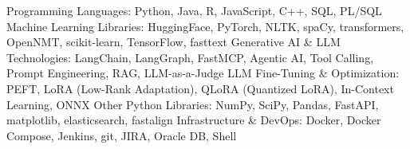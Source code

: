 \begin{cvskills}
  \cvskill
    {Programming Languages:}
    {Python, Java, R, JavaScript, C++, SQL, PL/SQL}
  \cvskill
    {Machine Learning Libraries:}
    {HuggingFace, PyTorch, NLTK, spaCy, transformers, OpenNMT, scikit-learn, TensorFlow, fasttext}
  \cvskill
    {Generative AI \& LLM Technologies:}
    {LangChain, LangGraph, FastMCP, Agentic AI, Tool Calling, Prompt Engineering, RAG, LLM-as-a-Judge}
  \cvskill
    {LLM Fine-Tuning \& Optimization:}
    {PEFT, LoRA (Low-Rank Adaptation), QLoRA (Quantized LoRA), In-Context Learning, ONNX}
  \cvskill
    {Other Python Libraries:}
    {NumPy, SciPy, Pandas, FastAPI, matplotlib, elasticsearch, fastalign}
  \cvskill
    {Infrastructure \& DevOps:}
    {Docker, Docker Compose, Jenkins, git, JIRA, Oracle DB, Shell}
\end{cvskills}